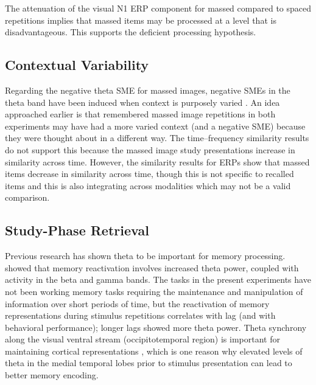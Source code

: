 The attenuation of the visual N1 ERP component for massed compared to spaced repetitions implies that massed items may be processed at a level that is disadvantageous.  This supports the deficient processing hypothesis.



\subsection{Contextual Variability}




Regarding the negative theta SME for massed images, negative SMEs in the theta band have been induced when context is purposely varied \cite{StauHans2013}.  An idea approached earlier is that remembered massed image repetitions in both experiments may have had a more varied context (and a negative SME) because they were thought about in a different way.  The time--frequency similarity results do not support this because the massed image study presentations increase in similarity across time.  However, the similarity results for ERPs show that massed items decrease in similarity across time, though this is not specific to recalled items and this is also integrating across modalities which may not be a valid comparison.

\subsection{Study-Phase Retrieval}


Previous research has shown theta to be important for memory processing.
 showed that memory reactivation involves increased theta power, coupled with activity in the beta and gamma bands.
The tasks in the present experiments have not been working memory tasks requiring the maintenance and manipulation of information over short periods of time, but the reactivation of memory representations during stimulus repetitions correlates with lag (and with behavioral performance); longer lags showed more theta power.
Theta synchrony along the visual ventral stream (occipitotemporal region) is important for maintaining cortical representations \cite{DuzeEtal2010}, which is one reason why elevated levels of theta in the medial temporal lobes prior to stimulus presentation can lead to better memory encoding.


